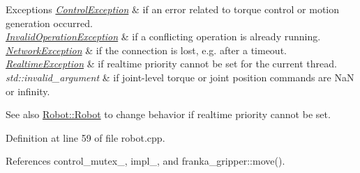 \begin{DoxyExceptions}{Exceptions}
{\em \hyperlink{structfranka_1_1ControlException}{Control\+Exception}} & if an error related to torque control or motion generation occurred. \\
\hline
{\em \hyperlink{structfranka_1_1InvalidOperationException}{Invalid\+Operation\+Exception}} & if a conflicting operation is already running. \\
\hline
{\em \hyperlink{structfranka_1_1NetworkException}{Network\+Exception}} & if the connection is lost, e.\+g. after a timeout. \\
\hline
{\em \hyperlink{structfranka_1_1RealtimeException}{Realtime\+Exception}} & if realtime priority cannot be set for the current thread. \\
\hline
{\em std\+::invalid\+\_\+argument} & if joint-\/level torque or joint position commands are NaN or infinity.\\
\hline
\end{DoxyExceptions}
\begin{DoxySeeAlso}{See also}
\hyperlink{classfranka_1_1Robot_ae63bc19390df3d54f3a270814df35eb6}{Robot\+::\+Robot} to change behavior if realtime priority cannot be set. 
\end{DoxySeeAlso}


Definition at line 59 of file robot.\+cpp.



References control\+\_\+mutex\+\_\+, impl\+\_\+, and franka\+\_\+gripper\+::move().


